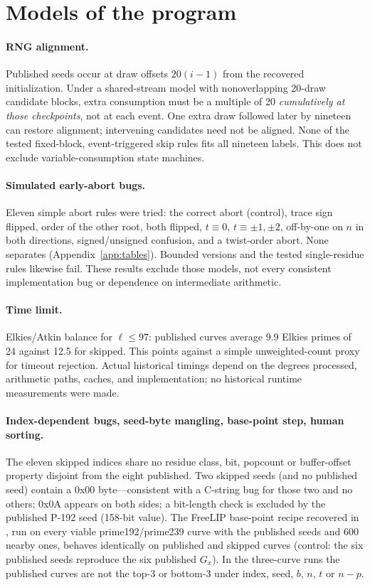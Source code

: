 \documentclass[11pt]{article}
\begin{document}
\section{Models of the program}\label{sec:program}

\paragraph{RNG alignment.} Published seeds occur at draw offsets $20(i-1)$ from the recovered initialization. Under a shared-stream model with nonoverlapping 20-draw candidate blocks, extra consumption must be a multiple of 20 \emph{cumulatively at those checkpoints}, not at each event. One extra draw followed later by nineteen can restore alignment; intervening candidates need not be aligned. None of the tested fixed-block, event-triggered skip rules fits all nineteen labels. This does not exclude variable-consumption state machines.

\paragraph{Simulated early-abort bugs.} Eleven simple abort rules were tried: the correct abort (control), trace sign flipped, order of the other root, both flipped, $t\equiv0$, $t\equiv\pm1,\pm2$, off-by-one on $n$ in both directions, signed/unsigned confusion, and a twist-order abort. None separates (Appendix~\ref{app:tables}). Bounded versions and the tested single-residue rules likewise fail. These results exclude those models, not every consistent implementation bug or dependence on intermediate arithmetic.

\paragraph{Time limit.} Elkies/Atkin balance for $\ell\le97$: published curves average 9.9 Elkies primes of 24 against 12.5 for skipped. This points against a simple unweighted-count proxy for timeout rejection. Actual historical timings depend on the degrees processed, arithmetic paths, caches, and implementation; no historical runtime measurements were made.

\paragraph{Index-dependent bugs, seed-byte mangling, base-point step, human sorting.} The eleven skipped indices share no residue class, bit, popcount or buffer-offset property disjoint from the eight published. Two skipped seeds (and no published seed) contain a 0x00 byte---consistent with a C-string bug for those two and no others; 0x0A appears on both sides; a bit-length check is excluded by the published P-192 seed (158-bit value). The FreeLIP base-point recipe recovered in \cite{anthropic}, run on every viable prime192/prime239 curve with the published seeds and 600 nearby ones, behaves identically on published and skipped curves (control: the six published seeds reproduce the six published $G_x$). In the three-curve runs the published curves are not the top-3 or bottom-3 under index, seed, $b$, $n$, $t$ or $n-p$.
\end{document}
